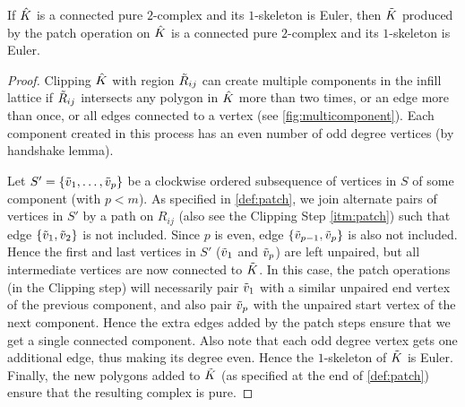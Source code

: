 \begin{lem}\label{lem:singlecomponent}
  If $\hat{K}$ is a connected pure $2$-complex and its $1$-skeleton is Euler, then $\tilde{K}$ produced by the patch operation on $\hat{K}$ is a connected pure $2$-complex and its $1$-skeleton is Euler. 
\end{lem}
\begin{proof}
  Clipping $\hat{K}$ with region $\tilde{R}_{ij}$ can create multiple components in the infill lattice if $\tilde{R}_{ij}$ intersects any polygon in $\hat{K}$ more than two times, or an edge more than once, or all edges connected to a vertex (see \cref{fig:multicomponent}).
  Each component created in this process has an even number of odd degree vertices (by handshake lemma).

  Let $S' =\{\tilde{v}_1, \dots, \tilde{v}_p\}$ be a clockwise ordered subsequence of vertices in $S$ of some component (with $p < m$).
  As specified in \cref{def:patch}, we join alternate pairs of vertices in $S'$ by a path on $R_{ij}$ (also see the Clipping Step \ref{itm:patch}) such that edge $\{\tilde{v}_1, \tilde{v}_2\}$ is not included.
  Since $p$ is even, edge $\{\tilde{v}_{p-1}, \tilde{v}_{p}\}$ is also not included.
  Hence the first and last vertices in $S'$ ($\tilde{v}_1$ and $\tilde{v}_p$) are left unpaired, but all intermediate vertices are now connected to $\tilde{K}$.
  In this case, the patch operations (in the Clipping step) will necessarily pair $\tilde{v}_1$ with a similar unpaired end vertex of the previous component, and also pair $\tilde{v}_p$ with the unpaired start vertex of the next component.
  Hence the extra edges added by the patch steps ensure that we get a single connected component.
  Also note that each odd degree vertex gets one additional edge, thus making its degree even.
  Hence the $1$-skeleton of $\tilde{K}$ is Euler.
  Finally, the new polygons added to $\tilde{K}$ (as specified at the end of \cref{def:patch}) ensure that the resulting complex is pure.
\end{proof}
\vspace*{-0.15in}

